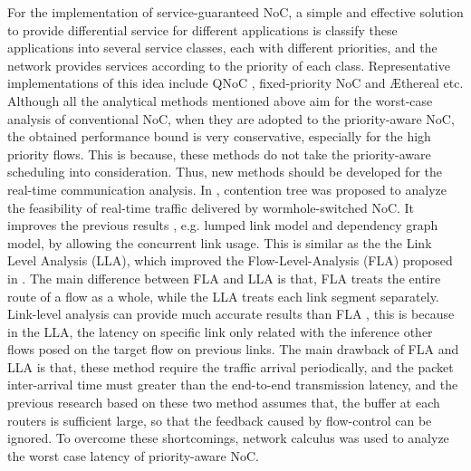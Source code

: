 \documentclass[10pt,journal]{IEEEtran}
\begin{document}
For the implementation of service-guaranteed NoC, a simple and effective solution to provide differential service for different applications is classify these applications into several service classes, each with different priorities, and the network provides services according to the priority of each class. Representative implementations of this idea include QNoC \cite{BCGK04}, fixed-priority NoC \cite{5685465} and {{\AE}thereal} \cite{GoDR05}\cite{RiGW01} etc. Although all the analytical methods mentioned above aim for the worst-case analysis of conventional NoC, when they are adopted to the priority-aware NoC, the obtained performance bound is very conservative, especially for the high priority flows. This is because, these methods do not take the priority-aware scheduling into consideration. Thus, new methods should be developed for the real-time communication analysis. In \cite{LuJS05}, contention tree was proposed to analyze the feasibility of real-time traffic delivered by wormhole-switched NoC. It improves the previous results , e.g. lumped link model \cite{707545} and dependency graph model\cite{708526}, by allowing the concurrent link usage. This is similar as the the Link Level Analysis \cite{73}\cite{holisticNoC13} (LLA), which improved the Flow-Level-Analysis (FLA) proposed in \cite{Shi:2008:RCA:1397757.1397996}. The main difference between FLA and LLA is that, FLA treats the entire route of a flow as a whole, while the LLA treats each link segment separately. Link-level analysis can provide much accurate results than FLA \cite{73}, this is because in the LLA, the latency on specific link only related with the inference other flows posed on the target flow on previous links. The main drawback of FLA and LLA is that, these method require the traffic arrival periodically, and the packet inter-arrival time must greater than the end-to-end transmission latency, and the previous research based on these two method assumes that, the buffer at each routers is sufficient large, so that the feedback caused by flow-control can be ignored. To overcome these shortcomings, network calculus \cite{Qian489900} was used to analyze the worst case latency of priority-aware NoC.
\end{document}
